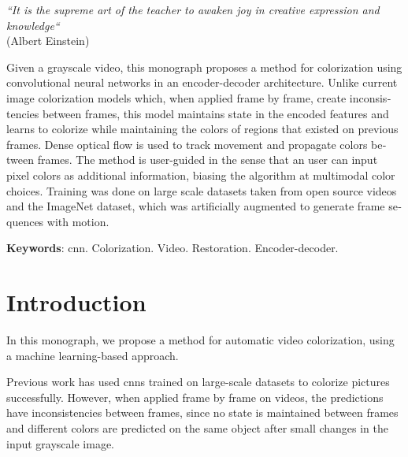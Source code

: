 \documentclass[12pt,openright,oneside,a4paper,english]{abntex2}
\begin{document}
\begin{otherlanguage}{english}
\begin{epigrafe}
\begin{flushright}
    \textit{``It is the supreme art of the teacher to awaken joy in creative expression and knowledge``}\\
    (Albert Einstein)
    \par\end{flushright}\end{epigrafe} %

    \begin{resumo}
    Given a grayscale video, this monograph proposes a method for colorization using convolutional neural networks in an encoder-decoder architecture. Unlike current image colorization models which, when applied frame by frame, create inconsistencies between frames, this model maintains state in the encoded features and learns to colorize while maintaining the colors of regions that existed on previous frames. Dense optical flow is used to track movement and propagate colors between frames. The method is user-guided in the sense that an user can input pixel colors as additional information, biasing the algorithm at multimodal color choices. Training was done on large scale datasets taken from open source videos and the ImageNet dataset, which was artificially augmented to generate frame sequences with motion.
    \vspace{\onelineskip}

    \noindent
    \textbf{Keywords}: \acrshort{cnn}. Colorization. Video. Restoration. Encoder-decoder.
    \end{resumo}
    \cleardoublepage
    \listoffigures
    \newpage
    \listoftables
    \newpage
    \printnoidxglossary[type=\acronymtype, title=List of Initials and Abbreviations]
    \newpage
    \tableofcontents


    \maketitle
    \pagestyle{plain}
    \chapter{Introduction}
    In this monograph, we propose a method for automatic video colorization, using a machine learning-based approach.

    Previous work \cite{colorful} has used \acrshort{cnn}s trained on large-scale datasets to colorize pictures successfully. However, when applied frame by frame on videos, the predictions have inconsistencies between frames, since no state is maintained between frames and different colors are predicted on the same object after small changes in the input grayscale image.


\end{otherlanguage}
\end{document}
